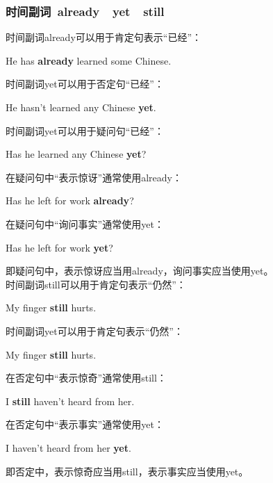 \documentclass[UTF8]{ctexart}
\newcommand{\littf}[1]{{\hspace{3pt}\ttfamily #1}}
\begin{document}
\newpage

\subsubsection{时间副词~\littf{already}~~\littf{yet}~~\littf{still}}
    时间副词\littf{already}可以用于肯定句表示“已经”：
    \begin{center}
        \large\ttfamily
        He has \textbf{already} learned some Chinese.\\[6mm]
    \end{center}
    时间副词\littf{yet}可以用于否定句“已经”：
    \begin{center}
        \large\ttfamily
        He hasn't learned any Chinese \textbf{yet}.\\[6mm]
    \end{center}
    时间副词\littf{yet}可以用于疑问句“已经”：
    \begin{center}
        \large\ttfamily
        Has he learned any Chinese \textbf{yet}?\\[6mm]
    \end{center}
    在疑问句中“表示惊讶”通常使用\littf{already}：
    \begin{center}
        \large\ttfamily
        Has he left for work \textbf{already}?\\[6mm]
    \end{center}
    在疑问句中“询问事实”通常使用\littf{yet}：
    \begin{center}
        \large\ttfamily
        Has he left for work \textbf{yet}?\\[3mm]
    \end{center}
    即疑问句中，表示惊讶应当用\littf{already}，询问事实应当使用\littf{yet}。\\[8mm]
    时间副词\littf{still}可以用于肯定句表示“仍然”：
    \begin{center}
        \large\ttfamily
        My finger \textbf{still} hurts.\\[6mm]
    \end{center}
    时间副词\littf{yet}可以用于肯定句表示“仍然”：
    \begin{center}
        \large\ttfamily
        My finger \textbf{still} hurts.\\[6mm]
    \end{center}
    在否定句中“表示惊奇”通常使用\littf{still}：
    \begin{center}
        \large\ttfamily
        I \textbf{still} haven't heard from her.\\[6mm]
    \end{center}
    在否定句中“表示事实”通常使用\littf{yet}：
    \begin{center}
        \large\ttfamily
        I haven't heard from her \textbf{yet}.\\[6mm]
    \end{center}
    即否定中，表示惊奇应当用\littf{still}，表示事实应当使用\littf{yet}。\\[6mm]
\end{document}
